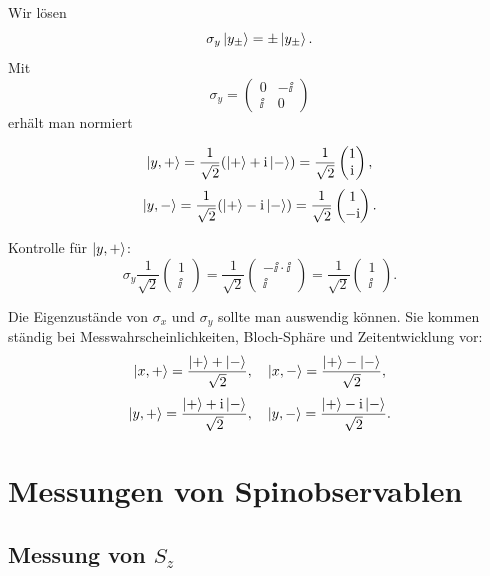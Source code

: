 Wir lösen
\[
    \sigma_y\left|y_\pm\right\rangle=\pm\left|y_\pm\right\rangle.
\]
Mit
\[
    \sigma_y=
    \begin{pmatrix}
        0&-\ii\\\ii&0
    \end{pmatrix}
\]
erhält man normiert
\begin{formulabox}
\[
    \left|y,+\right\rangle=\frac{1}{\sqrt2}(\left|+\right\rangle+\mathrm{i}\left|-\right\rangle)
    =\frac{1}{\sqrt2}
    \begin{pmatrix}
        1\\\mathrm{i}
    \end{pmatrix},
\]
\[
    \left|y,-\right\rangle=\frac{1}{\sqrt2}(\left|+\right\rangle-\mathrm{i}\left|-\right\rangle)
    =\frac{1}{\sqrt2}
    \begin{pmatrix}
        1\\-\mathrm{i}
    \end{pmatrix}.
\]
\end{formulabox}

Kontrolle für \(\left|y,+\right\rangle\):
\[
    \sigma_y\frac{1}{\sqrt2}
    \begin{pmatrix}1\\\ii\end{pmatrix}
    =\frac{1}{\sqrt2}
    \begin{pmatrix}
        -\ii\cdot\ii\\\ii
    \end{pmatrix}
    =\frac{1}{\sqrt2}
    \begin{pmatrix}1\\\ii\end{pmatrix}.
\]

\begin{examtipbox}
Die Eigenzustände von \(\sigma_x\) und \(\sigma_y\) sollte man auswendig können. Sie kommen ständig bei Messwahrscheinlichkeiten, Bloch-Sphäre und Zeitentwicklung vor:
\[
    \left|x,+\right\rangle=\frac{\left|+\right\rangle+\left|-\right\rangle}{\sqrt2},
    \quad
    \left|x,-\right\rangle=\frac{\left|+\right\rangle-\left|-\right\rangle}{\sqrt2},
\]
\[
    \left|y,+\right\rangle=\frac{\left|+\right\rangle+\mathrm{i}\left|-\right\rangle}{\sqrt2},
    \quad
    \left|y,-\right\rangle=\frac{\left|+\right\rangle-\mathrm{i}\left|-\right\rangle}{\sqrt2}.
\]
\end{examtipbox}

\section{Messungen von Spinobservablen}

\subsection{Messung von \(S_z\)}

